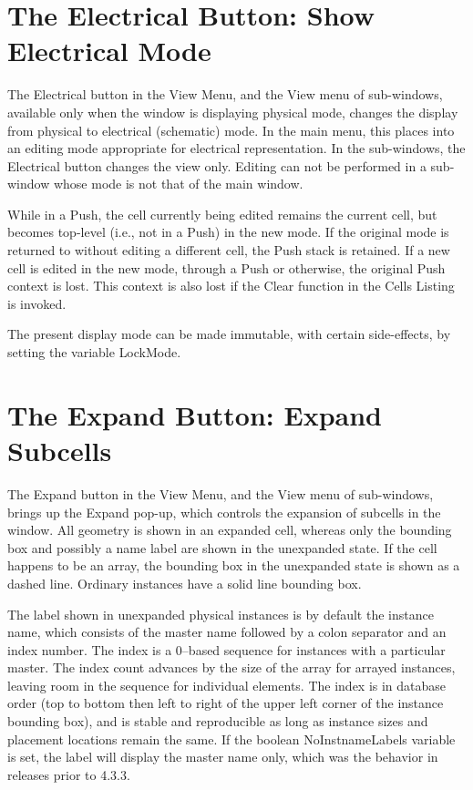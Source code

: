 \section{The {\cb Electrical} Button: Show Electrical Mode}
The {\cb Electrical} button in the {\cb View Menu}, and the {\cb View}
menu of sub-windows, available only when the window is displaying
physical mode, changes the display from physical to electrical
(schematic) mode.  In the main menu, this places {\Xic} into an
editing mode appropriate for electrical representation.  In the
sub-windows, the {\cb Electrical} button changes the view only. 
Editing can not be performed in a sub-window whose mode is not that of
the main window.

While in a {\cb Push}, the cell currently being edited
remains the current cell, but becomes top-level (i.e., not in a {\cb Push})
in the new mode.  If the original mode is returned to without editing
a different cell, the {\cb Push} stack is retained.  If a new cell is
edited in the new mode, through a {\cb Push} or otherwise, the
original {\cb Push} context is lost.  This context is also lost if the
{\cb Clear} function in the {\cb Cells Listing} is invoked.

The present display mode can be made immutable, with certain
side-effects, by setting the variable {\et LockMode}.


\section{The {\cb Expand} Button: Expand Subcells}
\label{expansion}
The {\cb Expand} button in the {\cb View Menu}, and the {\cb View}
menu of sub-windows, brings up the {\cb Expand} pop-up, which controls
the expansion of subcells in the window.  All geometry is shown in an
expanded cell, whereas only the bounding box and possibly a name label
are shown in the unexpanded state.  If the cell happens to be an
array, the bounding box in the unexpanded state is shown as a dashed
line.  Ordinary instances have a solid line bounding box.

The label shown in unexpanded physical instances is by default the
instance name, which consists of the master name followed by a colon
separator and an index number.  The index is a 0--based sequence for
instances with a particular master.  The index count advances by the
size of the array for arrayed instances, leaving room in the sequence
for individual elements.  The index is in database order (top to
bottom then left to right of the upper left corner of the instance
bounding box), and is stable and reproducible as long as instance
sizes and placement locations remain the same.  If the boolean {\et
NoInstnameLabels} variable is set, the label will display the master
name only, which was the behavior in {\Xic} releases prior to 4.3.3.

